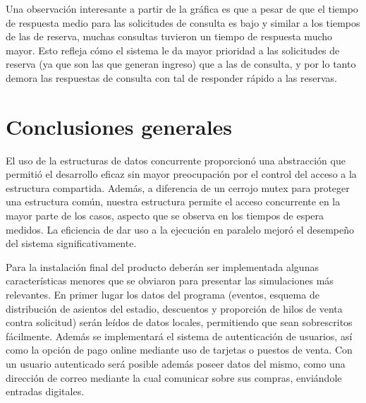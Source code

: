 \begin{figure}[H]
\label{fig:respuesta_reales}
\end{figure}

Una observación interesante a partir de la gráfica es que a pesar de que el tiempo de respuesta medio para las solicitudes de consulta es bajo
y similar a los tiempos de las de reserva, muchas consultas tuvieron un tiempo de respuesta mucho mayor. Esto refleja cómo el sistema
le da mayor prioridad a las solicitudes de reserva (ya que son las que generan ingreso) que a las de consulta, y por lo tanto demora las respuestas
de consulta con tal de responder rápido a las reservas.

\section{Conclusiones generales}

El uso de la estructuras de datos concurrente  proporcionó una abstracción que permitió el desarrollo eficaz
sin mayor preocupación por el control del acceso a la estructura compartida.
Además, a diferencia de un cerrojo mutex para proteger una estructura común, nuestra estructura permite el acceso concurrente en la mayor parte de los casos,
aspecto que se observa en los tiempos de espera medidos.
La eficiencia de dar uso a la ejecución en paralelo mejoró el desempeño del sistema significativamente.

Para la instalación final del producto deberán ser implementada algunas características menores que se obviaron para presentar las simulaciones más relevantes.
En primer lugar los datos del programa (eventos, esquema de distribución de asientos del estadio, descuentos y proporción de hilos de venta contra solicitud) serán leídos
de datos locales, permitiendo que sean sobrescritos fácilmente.
Además se implementará el sistema de autenticación de usuarios, así como la opción de pago online mediante uso de tarjetas o puestos de venta.
Con un usuario autenticado será posible además poseer datos del mismo, como una dirección de correo mediante la cual comunicar sobre sus compras,
enviándole entradas digitales.
